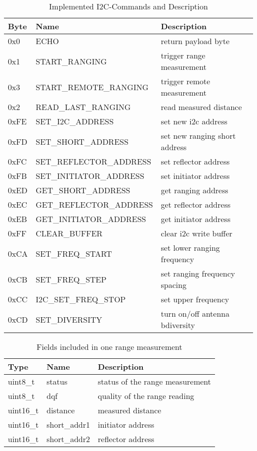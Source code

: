 \begin{table}
	
	\begin{tabularx}{\columnwidth}{l | l | X}
	Byte & Name & Description \\ \hline
	0x0  & ECHO & return payload byte\\
	0x1  & START\_RANGING & trigger range measurement\\
	0x3  & START\_REMOTE\_RANGING & trigger remote measurement\\
	0x2  & READ\_LAST\_RANGING & read measured distance\\
	0xFE & SET\_I2C\_ADDRESS & set new i2c address\\
	0xFD & SET\_SHORT\_ADDRESS & set new ranging short address\\
	0xFC & SET\_REFLECTOR\_ADDRESS & set reflector address\\
	0xFB & SET\_INITIATOR\_ADDRESS & set initiator address\\
	0xED & GET\_SHORT\_ADDRESS & get ranging address\\
	0xEC & GET\_REFLECTOR\_ADDRESS & get reflector address\\
	0xEB & GET\_INITIATOR\_ADDRESS & get initiator address\\
	0xFF & CLEAR\_BUFFER & clear i2c write buffer\\
	0xCA & SET\_FREQ\_START & set lower ranging frequency\\
	0xCB & SET\_FREQ\_STEP & set ranging frequency spacing\\
	0xCC & I2C\_SET\_FREQ\_STOP & set upper frequency\\
	0xCD & SET\_DIVERSITY & turn on/off antenna bdiversity\\
	\end{tabularx}

	\caption{Implemented I2C-Commands and Description}
	\label{i2ccommands}
	
\end{table}

\begin{table}
	
	\begin{tabularx}{\columnwidth}{l | l | X}
	Type & Name & Description \\ \hline
		uint8\_t  & status       & status of the range measurement \\
		uint8\_t  & dqf          & quality of the range reading \\
		uint16\_t & distance     & measured distance \\
		uint16\_t & short\_addr1 & initiator address \\
		uint16\_t & short\_addr2 & reflector address \\
	\end{tabularx}

	\caption{Fields included in one range measurement}
	\label{rangefields}
	
\end{table}



